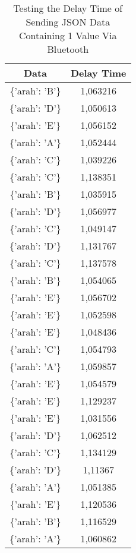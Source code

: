\begin{table}[!h]
\centering
  \caption{Testing the Delay Time of Sending JSON Data Containing 1 Value Via Bluetooth}
  \label{tbl:delayBluetoothJSON1}
  \begin{tabular}{|c|c|}
  \hline
  Data               & Delay Time  \\ \hline
  \{'arah': 'B'\}    & 1,063216    \\ \hline
  \{'arah': 'D'\}    & 1,050613    \\ \hline
  \{'arah': 'E'\}    & 1,056152    \\ \hline
  \{'arah': 'A'\}    & 1,052444    \\ \hline
  \{'arah': 'C'\}    & 1,039226    \\ \hline
  \{'arah': 'C'\}    & 1,138351    \\ \hline
  \{'arah': 'B'\}    & 1,035915    \\ \hline
  \{'arah': 'D'\}    & 1,056977    \\ \hline
  \{'arah': 'C'\}    & 1,049147    \\ \hline
  \{'arah': 'D'\}    & 1,131767    \\ \hline
  \{'arah': 'C'\}    & 1,137578    \\ \hline
  \{'arah': 'B'\}    & 1,054065    \\ \hline
  \{'arah': 'E'\}    & 1,056702    \\ \hline
  \{'arah': 'E'\}    & 1,052598    \\ \hline
  \{'arah': 'E'\}    & 1,048436    \\ \hline
  \{'arah': 'C'\}    & 1,054793    \\ \hline
  \{'arah': 'A'\}    & 1,059857    \\ \hline
  \{'arah': 'E'\}    & 1,054579    \\ \hline
  \{'arah': 'E'\}    & 1,129237    \\ \hline
  \{'arah': 'E'\}    & 1,031556    \\ \hline
  \{'arah': 'D'\}    & 1,062512    \\ \hline
  \{'arah': 'C'\}    & 1,134129    \\ \hline
  \{'arah': 'D'\}    & 1,11367     \\ \hline
  \{'arah': 'A'\}    & 1,051385    \\ \hline
  \{'arah': 'E'\}    & 1,120536    \\ \hline
  \{'arah': 'B'\}    & 1,116529    \\ \hline
  \{'arah': 'A'\}    & 1,060862    \\ \hline

\end{tabular}
\end{table}
